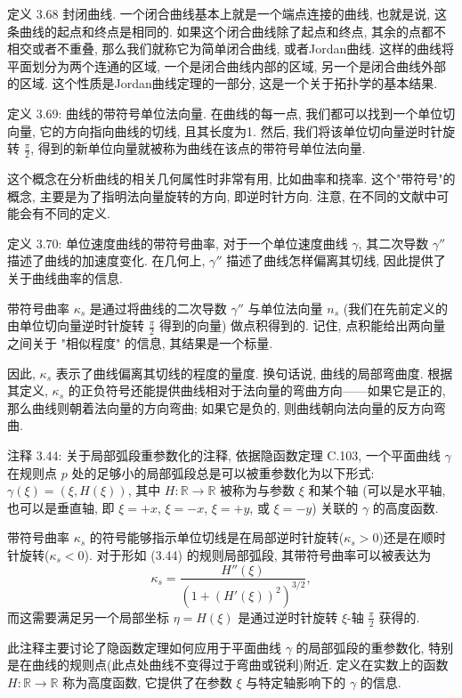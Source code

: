 \documentclass[a4paper]{ctexart}
\begin{document}
{定义 3.68 封闭曲线. 一个闭合曲线基本上就是一个端点连接的曲线, 也就是说, 这条曲线的起点和终点是相同的. 
如果这个闭合曲线除了起点和终点, 其余的点都不相交或者不重叠, 那么我们就称它为简单闭合曲线, 或者Jordan曲线. 
这样的曲线将平面划分为两个连通的区域, 一个是闭合曲线内部的区域, 另一个是闭合曲线外部的区域. 
这个性质是Jordan曲线定理的一部分, 这是一个关于拓扑学的基本结果. 

定义 3.69: 曲线的带符号单位法向量. 在曲线的每一点, 我们都可以找到一个单位切向量, 它的方向指向曲线的切线, 
且其长度为1. 然后, 我们将该单位切向量逆时针旋转 $\frac{\pi}{2}$, 得到的新单位向量就被称为曲线在该点的带符号单位法向量.

这个概念在分析曲线的相关几何属性时非常有用, 比如曲率和挠率. 这个"带符号"的概念, 
主要是为了指明法向量旋转的方向, 即逆时针方向. 注意, 在不同的文献中可能会有不同的定义. 

定义 3.70: 单位速度曲线的带符号曲率, 对于一个单位速度曲线 $\gamma$, 
其二次导数 $\gamma''$ 描述了曲线的加速度变化. 在几何上, $\gamma''$ 描述了曲线怎样偏离其切线, 
因此提供了关于曲线曲率的信息. 

带符号曲率 $\kappa_s$ 是通过将曲线的二次导数 $\gamma''$ 与单位法向量 $n_s$
(我们在先前定义的由单位切向量逆时针旋转 $\frac{\pi}{2}$ 得到的向量) 做点积得到的. 
记住, 点积能给出两向量之间关于 "相似程度" 的信息, 其结果是一个标量. 

因此, $\kappa_s$ 表示了曲线偏离其切线的程度的量度. 换句话说, 
曲线的局部弯曲度. 根据其定义, $\kappa_s$ 的正负符号还能提供曲线相对于法向量的弯曲方向——如果它是正的, 
那么曲线则朝着法向量的方向弯曲; 如果它是负的, 则曲线朝向法向量的反方向弯曲. 

注释 3.44: 关于局部弧段重参数化的注释, 依据隐函数定理 C.103, 一个平面曲线 $\gamma$ 在规则点 $p$ 
处的足够小的局部弧段总是可以被重参数化为以下形式: $\gamma(\xi) = (\xi, H(\xi))$, 
其中 $H: \mathbb{R} \rightarrow \mathbb{R}$ 被称为与参数 $\xi$ 和某个轴
(可以是水平轴, 也可以是垂直轴, 即 $\xi = +x$, $\xi = -x$, $\xi = +y$, 或 $\xi = -y$) 关联的 $\gamma$ 的高度函数.

带符号曲率 $\kappa_s$ 的符号能够指示单位切线是在局部逆时针旋转($\kappa_s > 0$)还是在顺时针旋转($\kappa_s < 0$). 
对于形如 (3.44) 的规则局部弧段, 其带符号曲率可以被表达为
$$
\kappa_s = \frac{H''(\xi)}{(1 + (H'(\xi))^2)^{3/2}},
$$
而这需要满足另一个局部坐标 $\eta = H(\xi)$ 是通过逆时针旋转 $\xi$-轴 $\frac{\pi}{2}$ 获得的.

此注释主要讨论了隐函数定理如何应用于平面曲线 $\gamma$ 的局部弧段的重参数化, 特别是在曲线的规则点(此点处曲线不变得过于弯曲或锐利)附近.
定义在实数上的函数 $H: \mathbb{R} \rightarrow \mathbb{R}$ 称为高度函数, 它提供了在参数 $\xi$ 
与特定轴影响下的 $\gamma$ 的信息.

}
\end{document}
